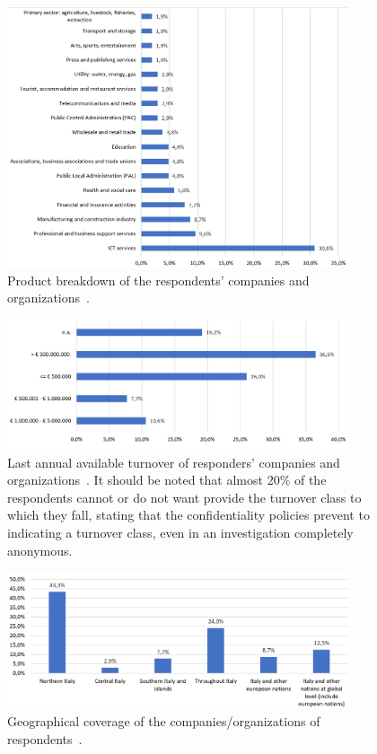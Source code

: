 \documentclass{easychair}
\begin{document}
\begin{figure}
	\centering
	\includegraphics[width=0.90\textwidth]{pictures/fig9.png}
	\caption{Product breakdown of the respondents' companies and organizations~\cite{oad20}.}
	\label{fig:9}
\end{figure}

\begin{figure}
	\centering
	\includegraphics[width=0.90\textwidth]{pictures/fig7.png}
	\caption{Last annual available turnover of responders' companies and organizations~\cite{oad20}. 
		 It should be noted that almost 20\% of the respondents cannot or do not want provide the turnover class to which they fall, stating that the confidentiality policies prevent to indicating a turnover class, even in an investigation completely anonymous.
	}
	\label{fig:7}
\end{figure}

\begin{figure}
	\centering
	\includegraphics[width=0.90\textwidth]{pictures/fig8.png}
	\caption{Geographical coverage of the companies/organizations of respondents~\cite{oad20}.}
	\label{fig:8}
\end{figure}
\end{document}
